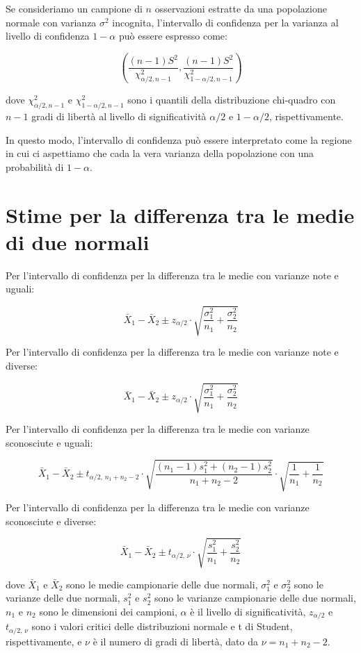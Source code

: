 Se consideriamo un campione di $n$ osservazioni estratte da una popolazione normale con varianza $\sigma^2$ incognita, l'intervallo di confidenza per la varianza al livello di confidenza $1-\alpha$ può essere espresso come:

$$(\frac{(n-1)S^2}{\chi_{\alpha/2,n-1}^2},\frac{(n-1)S^2}{\chi_{1-\alpha/2,n-1}^2})$$

dove $\chi_{\alpha/2,n-1}^2$ e $\chi_{1-\alpha/2,n-1}^2$ sono i quantili della distribuzione chi-quadro con $n-1$ gradi di libertà al livello di significatività $\alpha/2$ e $1-\alpha/2$, rispettivamente.

In questo modo, l'intervallo di confidenza può essere interpretato come la regione in cui ci aspettiamo che cada la vera varianza della popolazione con una probabilità di $1-\alpha$.


\section{Stime per la differenza tra le medie di due normali}

Per l'intervallo di confidenza per la differenza tra le medie con varianze note e uguali:

$$
\bar{X}_1 - \bar{X}_2 \pm z_{\alpha/2} \cdot \sqrt{\frac{\sigma_1^2}{n_1} + \frac{\sigma_2^2}{n_2}}
$$

Per l'intervallo di confidenza per la differenza tra le medie con varianze note e diverse:

$$
\bar{X}_1 - \bar{X}_2 \pm z_{\alpha/2} \cdot \sqrt{\frac{\sigma_1^2}{n_1} + \frac{\sigma_2^2}{n_2}}
$$

Per l'intervallo di confidenza per la differenza tra le medie con varianze sconosciute e uguali:

$$
\bar{X}_1 - \bar{X}_2 \pm t_{\alpha/2, \,n_1+n_2-2} \cdot \sqrt{\frac{(n_1-1)s_1^2 + (n_2-1)s_2^2}{n_1+n_2-2}} \cdot \sqrt{\frac{1}{n_1} + \frac{1}{n_2}}
$$

Per l'intervallo di confidenza per la differenza tra le medie con varianze sconosciute e diverse:

$$
\bar{X}_1 - \bar{X}_2 \pm t_{\alpha/2, \,\nu} \cdot \sqrt{\frac{s_1^2}{n_1} + \frac{s_2^2}{n_2}}
$$

dove $\bar{X}_1$ e $\bar{X}_2$ sono le medie campionarie delle due normali, $\sigma_1^2$ e $\sigma_2^2$ sono le varianze delle due normali, $s_1^2$ e $s_2^2$ sono le varianze campionarie delle due normali, $n_1$ e $n_2$ sono le dimensioni dei campioni, $\alpha$ è il livello di significatività, $z_{\alpha/2}$ e $t_{\alpha/2, \, \nu}$ sono i valori critici delle distribuzioni normale e t di Student, rispettivamente, e $\nu$ è il numero di gradi di libertà, dato da $\nu = n_1 + n_2 - 2$.


